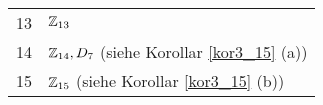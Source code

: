 \begin{beispiel}
		\begin{center}
			\begin{tabular}{|C{2cm}|L{8cm}|}
				13 & $\mathbb{Z}_{13}$\\
				14 & $\mathbb{Z}_{14}, D_7$ (siehe Korollar \ref{kor3_15} (a))\\
				15 & $\mathbb{Z}_{15}$ (siehe Korollar \ref{kor3_15} (b))\\
				\hline
			\end{tabular}
		\end{center}
\end{beispiel}






